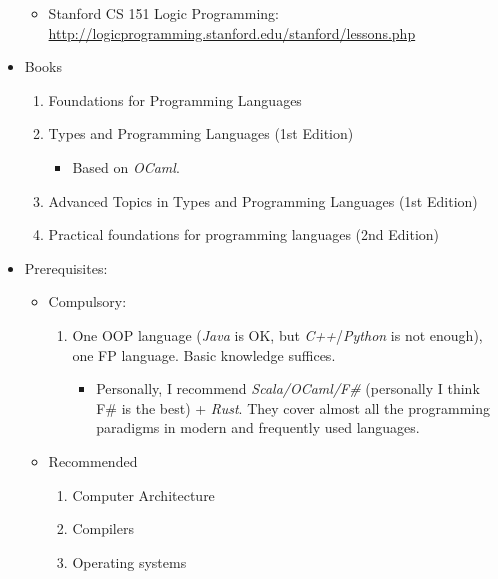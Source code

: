 \documentclass{article}
\begin{document}
\begin{itemize}
\begin{itemize}
\begin{itemize}
\begin{itemize}
                    \end{itemize}
            \end{itemize}

            \item Stanford CS 151 Logic Programming:\\
            \href{http://logicprogramming.stanford.edu/stanford/lessons.php}{http://logicprogramming.stanford.edu/stanford/lessons.php}
        \end{itemize}
    \item Books
    \begin{enumerate}
        \item Foundations for Programming Languages
        \cite{mitchell1996foundations}
        \item Types and Programming Languages (1st Edition)
        \cite{pierce2002types}
        \begin{itemize}
            \item Based on \emph{OCaml}.
        \end{itemize}
        \item Advanced Topics in Types and Programming Languages (1st Edition) \cite{pierce2004advanced}
        \item Practical foundations for programming languages (2nd Edition)
        \cite{harper2016practical}
    \end{enumerate}
    \item Prerequisites:
    \begin{itemize}
        \item Compulsory:
        \begin{enumerate}

            \item One OOP language  (\emph{Java} is OK, but \emph{C++}/\emph{Python} is not enough), one FP language.
            Basic knowledge suffices.
            \begin{itemize}
                \item Personally, I recommend \emph{Scala/OCaml/F\#} (personally I think F\# is the best) + \emph{Rust}.
                They cover almost all the programming paradigms in modern and frequently used languages.
            \end{itemize}
        \end{enumerate}
        \item Recommended
        \begin{enumerate}
            \item Computer Architecture
            \item Compilers
            \item Operating systems
        \end{enumerate}
    \end{itemize}    
\end{itemize}
\end{document}
